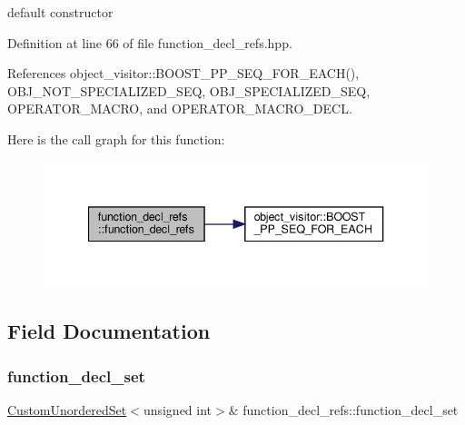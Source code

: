 default constructor 



Definition at line 66 of file function\+\_\+decl\+\_\+refs.\+hpp.



References object\+\_\+visitor\+::\+B\+O\+O\+S\+T\+\_\+\+P\+P\+\_\+\+S\+E\+Q\+\_\+\+F\+O\+R\+\_\+\+E\+A\+C\+H(), O\+B\+J\+\_\+\+N\+O\+T\+\_\+\+S\+P\+E\+C\+I\+A\+L\+I\+Z\+E\+D\+\_\+\+S\+EQ, O\+B\+J\+\_\+\+S\+P\+E\+C\+I\+A\+L\+I\+Z\+E\+D\+\_\+\+S\+EQ, O\+P\+E\+R\+A\+T\+O\+R\+\_\+\+M\+A\+C\+RO, and O\+P\+E\+R\+A\+T\+O\+R\+\_\+\+M\+A\+C\+R\+O\+\_\+\+D\+E\+CL.

Here is the call graph for this function\+:
\nopagebreak
\begin{figure}[H]
\begin{center}
\leavevmode
\includegraphics[width=340pt]{d2/da2/structfunction__decl__refs_ab875e24a355633ca74fc7aec582f1ed5_cgraph}
\end{center}
\end{figure}


\subsection{Field Documentation}
\mbox{\label{structfunction__decl__refs_adf1f844a542e78f1f7923501a079a488}} 
\subsubsection{\texorpdfstring{function\+\_\+decl\+\_\+set}{function\_decl\_set}}
{\footnotesize\ttfamily \hyperlink{classCustomUnorderedSet}{Custom\+Unordered\+Set}$<$unsigned int$>$\& function\+\_\+decl\+\_\+refs\+::function\+\_\+decl\+\_\+set\hspace{0.3cm}{\ttfamily [private]}}



